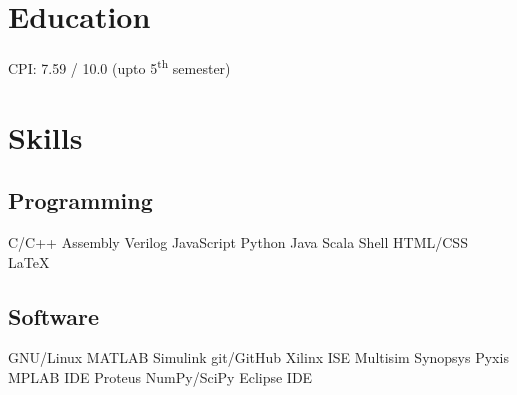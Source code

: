 \documentclass[]{deedy}
\begin{document}
\begin{minipage}[t]{0.27\textwidth}
\begin{flushleft}
%
\section{Education}
%
CPI: 7.59 / 10.0 (upto 5\textsuperscript{th} semester)\\
\sectionsep
%
\sectionsep
%
\sectionsep
\section{Skills}
\subsection{Programming}
C/C++ \textbullet{} Assembly \textbullet{} Verilog \textbullet{} JavaScript \textbullet{} Python \textbullet{} Java \textbullet{} Scala \textbullet{} Shell \textbullet{} HTML/CSS \textbullet{}\\
\LaTeX\ 
%
\subsection{Software}
GNU/Linux \textbullet{} MATLAB \textbullet{} Simulink \textbullet{} git/GitHub \textbullet{} Xilinx ISE \textbullet{} Multisim \textbullet{} Synopsys \textbullet{} Pyxis \textbullet{} MPLAB IDE \textbullet{} Proteus \textbullet{} NumPy/SciPy \textbullet{} Eclipse IDE
%

\end{flushleft}
\end{minipage}
\end{document}
